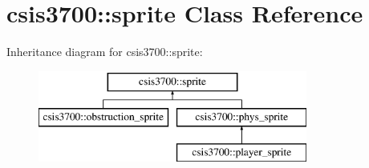 \hypertarget{classcsis3700_1_1sprite}{\section{csis3700\-:\-:sprite Class Reference}
\label{classcsis3700_1_1sprite}
}
Inheritance diagram for csis3700\-:\-:sprite\-:\begin{figure}[H]
\begin{center}
\leavevmode
\includegraphics[height=3.000000cm]{classcsis3700_1_1sprite}
\end{center}
\end{figure}
